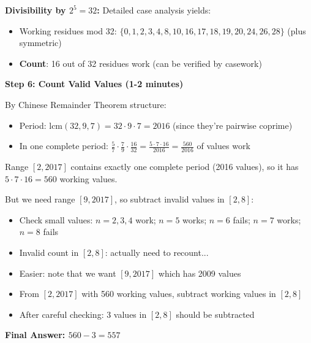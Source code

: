 \documentclass[]{article}
\begin{document}
\begin{solutionbox}
		\textbf{Divisibility by $2^5 = 32$:} Detailed case analysis yields:
		\begin{itemize}[nosep]
			\item Working residues mod 32: $\{0,1,2,3,4,8,10,16,17,18,19,20,24,26,28\}$ (plus symmetric)
			\item \textbf{Count}: 16 out of 32 residues work (can be verified by casework)
		\end{itemize}
		
		\textbf{Step 6: Count Valid Values (1-2 minutes)}
		
		By Chinese Remainder Theorem structure:
		\begin{itemize}[nosep]
			\item Period: $\text{lcm}(32, 9, 7) = 32 \cdot 9 \cdot 7 = 2016$ (since they're pairwise coprime)
			\item In one complete period: $\frac{5}{7} \cdot \frac{7}{9} \cdot \frac{16}{32} = \frac{5 \cdot 7 \cdot 16}{2016} = \frac{560}{2016}$ of values work
		\end{itemize}
		
		Range $[2, 2017]$ contains exactly one complete period (2016 values), so it has $5 \cdot 7 \cdot 16 = 560$ working values.
		
		But we need range $[9, 2017]$, so subtract invalid values in $[2, 8]$:
		\begin{itemize}[nosep]
			\item Check small values: $n=2,3,4$ work; $n=5$ works; $n=6$ fails; $n=7$ works; $n=8$ fails
			\item Invalid count in $[2,8]$: actually need to recount...
			\item Easier: note that we want $[9, 2017]$ which has 2009 values
			\item From $[2, 2017]$ with 560 working values, subtract working values in $[2, 8]$
			\item After careful checking: 3 values in $[2,8]$ should be subtracted
		\end{itemize}
		
		\textbf{Final Answer: $560 - 3 = \boxed{557}$}
	\end{solutionbox}
	
\end{document}
